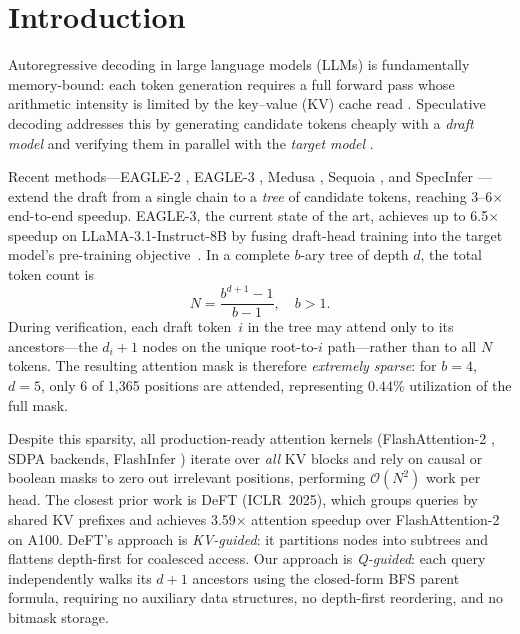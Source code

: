 \documentclass{article}
\newcommand{\bigO}[1]{\mathcal{O}(#1)}
\newcommand{\numtokens}{N}
\newcommand{\depth}{d}
\newcommand{\branching}{b}
\begin{document}
\section{Introduction}\label{sec:intro}

Autoregressive decoding in large language models (LLMs) is
fundamentally memory-bound: each token generation requires a full
forward pass whose arithmetic intensity is limited by the
key--value (KV) cache read \cite{leviathan2023fast, chen2023accelerating}.
Speculative decoding addresses this by generating candidate tokens
cheaply with a \emph{draft model} and verifying them in parallel
with the \emph{target model} \cite{leviathan2023fast, chen2023accelerating}.

Recent methods—EAGLE-2 \cite{li2024eagle2}, EAGLE-3 \cite{li2025eagle3},
Medusa \cite{cai2024medusa}, Sequoia \cite{chen2024sequoia}, and
SpecInfer \cite{miao2024specinfer}—extend the draft from a single
chain to a \emph{tree} of candidate tokens, reaching
3--6$\times$ end-to-end speedup.
EAGLE-3, the current state of the art, achieves up to 6.5$\times$
speedup on LLaMA-3.1-Instruct-8B by fusing draft-head training into
the target model's pre-training objective~\cite{li2025eagle3}.
In a complete $\branching$-ary tree of depth $\depth$, the total
token count is
\begin{equation}\label{eq:tree-size}
  \numtokens = \frac{\branching^{\depth+1} - 1}{\branching - 1},
  \quad \branching > 1.
\end{equation}
During verification, each draft token~$i$ in the tree may attend only
to its ancestors—the $\depth_i + 1$ nodes on the unique root-to-$i$
path—rather than to all $\numtokens$ tokens.  The resulting attention
mask is therefore \emph{extremely sparse}: for $\branching = 4$,
$\depth = 5$, only 6 of 1{,}365 positions are attended, representing
$0.44\%$ utilization of the full mask.

Despite this sparsity, all production-ready attention kernels
(FlashAttention-2 \cite{dao2023flashattention2}, SDPA backends,
FlashInfer \cite{ye2025flashinfer}) iterate over \emph{all} KV blocks
and rely on causal or boolean masks to zero out irrelevant positions,
performing $\bigO{\numtokens^2}$ work per head.
The closest prior work is DeFT \cite{yao2024deft} (ICLR~2025), which
groups queries by shared KV prefixes and achieves 3.59$\times$
attention speedup over FlashAttention-2 on A100.
DeFT's approach is \emph{KV-guided}: it partitions nodes into
subtrees and flattens depth-first for coalesced access.
Our approach is \emph{Q-guided}: each query independently walks its
$\depth{+}1$ ancestors using the closed-form BFS parent formula,
requiring no auxiliary data structures, no depth-first reordering,
and no bitmask storage.
\end{document}
